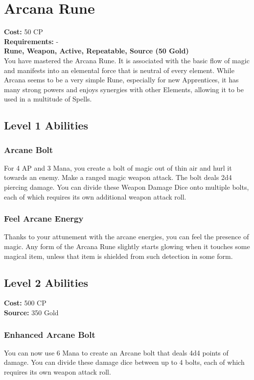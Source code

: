 \twocolumn
\section{Arcana Rune}
\textbf{Cost:} 50 CP\\
\textbf{Requirements:} -\\
\textbf{Rune, Weapon, Active, Repeatable, Source (50 Gold)}\\
You have mastered the Arcana Rune. It is associated with the basic flow of magic and manifests into an elemental force that is neutral of every element. While Arcana seems to be a very simple Rune, especially for new Apprentices, it has many strong powers and enjoys synergies with other Elements, allowing it to be used in a multitude of Spells.\\
\subsection{Level 1 Abilities}

\subsubsection{Arcane Bolt}
For 4 AP and 3 Mana, you create a bolt of magic out of thin air and hurl it towards an enemy. Make a ranged magic weapon attack. The bolt deals 2d4 piercing damage. You can divide these Weapon Damage Dice onto multiple bolts, each of which requires its own additional weapon attack roll.

\subsubsection{Feel Arcane Energy}
Thanks to your attunement with the arcane energies, you can feel the presence of magic. Any form of the Arcana Rune slightly starts glowing when it touches some magical item, unless that item is shielded from such detection in some form.

\subsection{Level 2 Abilities}
\textbf{Cost:} 500 CP\\
\textbf{Source:} 350 Gold
\subsubsection{Enhanced Arcane Bolt}
You can now use 6 Mana to create an Arcane bolt that deals 4d4 points of damage. You can divide these damage dice between up to 4 bolts, each of which requires its own weapon attack roll.

